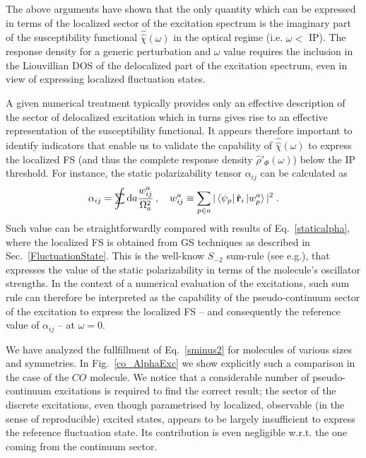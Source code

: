 \documentclass[reprint,aps,prb]{revtex4-1}
\newcommand{\dd}{{\rm d}}
\newcommand{\sint}{\mathrlap{\displaystyle\int}
\mathrlap{\textstyle\sum}
\phantom{\mathrlap{\displaystyle
\int}\textstyle\sum}}
\newcommand{\be}{\begin{equation}}
\newcommand{\ee}{\end{equation}}
\newcommand{\lb}{\label}
\newcommand{\op}[1]{\hat {#1}}
\newcommand{\sop}[1]{\op{\op {#1}}}
\newcommand{\dm}{\op{\rho}}
\begin{document}
The above arguments have shown that the only quantity which can be expressed in terms of the localized sector of the excitation spectrum is the imaginary part of the susceptibility functional $\sop \chi(\omega)$ in the optical regime (i.e. $\omega <$  IP). The response density for a generic perturbation and $\omega$ value requires the inclusion in the Liouvillian DOS of the delocalized part of the excitation spectrum, even in view of expressing localized fluctuation states.

A given numerical treatment typically provides only an effective description of the sector of delocalized excitation which in turns gives rise to an effective
representation of the susceptibility functional. It appears therefore important to identify indicators that enable us to validate the capability
of $\sop \chi(\omega)$ to express the localized FS (and thus the complete response density $\dm'_\Phi(\omega)$) below the IP threshold.
For instance, the static polarizability tensor $\alpha_{ij}$ can be calculated as
\be\lb{sminus2}
\alpha_{ij} = \sint \dd a \frac{w^a_{ij}}{\Omega_a^2}\,, \quad w^a_{ij} \equiv \sum_{p\in a} |\bra{\psi_p} \op {\mathbf r}_i \ket{w_p^a}|^2 \;.
\ee
Such value can be straightforwardly compared with results of Eq.~\eqref{staticalpha}, where the localized FS is obtained from GS techniques as
described in Sec.~\ref{FluctuationState}.
This is the well-know $S_{-2}$ sum-rule (see e.g.\cite{Wagner2012}), that expresses the value of the static polarizability
in terms of the molecule's oscillator strengths.
In the context of a numerical evaluation of the excitations, such sum rule can therefore be interpreted as the capability of the pseudo-continuum sector of the excitation to
express the localized FS -- and consequently the reference value of $\alpha_{ij}$ -- at $\omega=0$.

We have analyzed the fullfillment of Eq.~\eqref{sminus2} for molecules of various
sizes and symmetries.
In Fig.~\ref{co_AlphaExc} we show explicitly such a comparison in the case of the $CO$ molecule.
We notice that a considerable number of pseudo-continuum excitations is required
to find the correct result; the sector of the discrete excitations, even though
parametrised by localized, observable (in the sense of reproducible) excited states,
appears to be largely insufficient to express the reference fluctuation state. Its contribution is even negligible w.r.t.
the one coming from the continuum sector.
\end{document}

